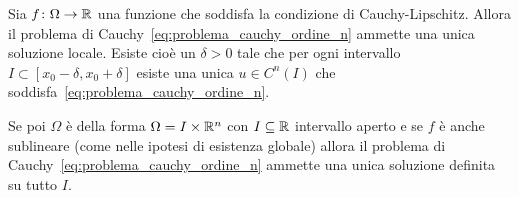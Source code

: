 \begin{theorem}
\label{th:cauchy_lipschitz_ordine_n}
Sia $f\colon \Omega\to \mathbb R$
una funzione che soddisfa la condizione di Cauchy-Lipschitz.
Allora il problema di Cauchy~\eqref{eq:problema_cauchy_ordine_n}
ammette una unica soluzione locale.
Esiste cioè un $\delta>0$ tale che per ogni intervallo
$I\subset [x_0-\delta,x_0+\delta]$ esiste una unica $u\in C^n(I)$ che
soddisfa~\eqref{eq:problema_cauchy_ordine_n}.

Se poi $\Omega$ è della forma $\Omega = I \times \mathbb R^n$ con $I\subseteq \mathbb R$ intervallo aperto e se
$f$ è anche sublineare (come nelle ipotesi di esistenza globale) allora il problema di Cauchy~\eqref{eq:problema_cauchy_ordine_n} ammette una unica soluzione definita su tutto $I$.
\end{theorem}
%
